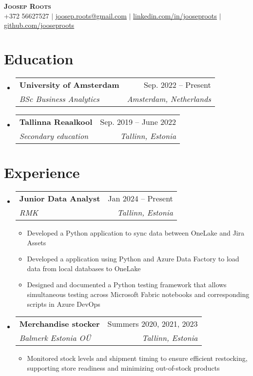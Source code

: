 \documentclass[letterpaper,11pt]{article}
\makeatletter
\newcommand{\resumeItem}[1]{
  \item\small{
    {#1 \vspace{-2pt}}
  }
}
\newcommand{\resumeSubheading}[4]{
  \vspace{-2pt}\item
    \begin{tabular*}{0.97\textwidth}[t]{l@{\extracolsep{\fill}}r}
      \textbf{#1} & #2 \\
      \textit{\small#3} & \textit{\small #4} \\
    \end{tabular*}\vspace{-7pt}
}
\newcommand{\resumeSubHeadingListStart}{\begin{itemize}[leftmargin=0.15in, label={}]}
\newcommand{\resumeSubHeadingListEnd}{\end{itemize}}
\newcommand{\resumeItemListStart}{\begin{itemize}}
\newcommand{\resumeItemListEnd}{\end{itemize}\vspace{-5pt}}
\makeatother
\begin{document}
\begin{center}
    \textbf{\Huge \scshape Joosep Roots} \\ \vspace{1pt}
    \small +372 56627527 $|$ \href{mailto:joosep.roots@gmail.com}{\underline{joosep.roots@gmail.com}} $|$ 
    \href{https://www.linkedin.com/in/jooseproots}{\underline{linkedin.com/in/jooseproots}} $|$
    \href{https://github.com/jooseproots}{\underline{github.com/jooseproots}}
\end{center}


\section{Education}
  \resumeSubHeadingListStart
    \resumeSubheading
      {University of Amsterdam}{Sep. 2022 -- Present}
      {BSc Business Analytics}{Amsterdam, Netherlands}
    \resumeSubheading
      {Tallinna Reaalkool}{Sep. 2019 -- June 2022}
      {Secondary education}{Tallinn, Estonia}
  \resumeSubHeadingListEnd


\section{Experience}
  \resumeSubHeadingListStart

    \resumeSubheading
      {Junior Data Analyst}{Jan 2024 -- Present}
      {RMK}{Tallinn, Estonia}
      \resumeItemListStart
        \resumeItem{Developed a Python application to sync data between OneLake and Jira Assets}
        \resumeItem{Developed a application using Python and Azure Data Factory to load data from local databases to OneLake}
        \resumeItem{Designed and documented a Python testing framework that allows simultaneous testing across Microsoft Fabric notebooks and corresponding scripts in Azure DevOps}
      \resumeItemListEnd

    \resumeSubheading
      {Merchandise stocker}{Summers 2020, 2021, 2023}
      {Balmerk Estonia OÜ}{Tallinn, Estonia}
      \resumeItemListStart
        \resumeItem{Monitored stock levels and shipment timing to ensure efficient restocking, supporting store readiness and minimizing out-of-stock products}
    \resumeItemListEnd

  \resumeSubHeadingListEnd


\end{document}
